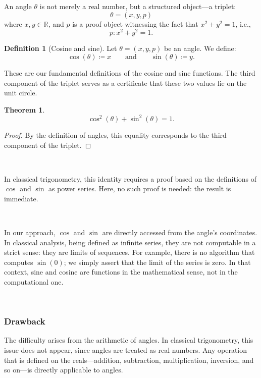 \documentclass[11pt]{article}
\newtheorem{theorem}{Theorem}
\theoremstyle{definition}
\newtheorem{definition}{Definition}[section]
\begin{document}
\

\

\noindent An angle \( \theta \) is not merely a real number, but a
structured object—a triplet:
\[
\theta = (x, y, p)
\]
where \( x, y \in \mathbb{R} \), and \( p \) is a proof object
witnessing the fact that \( x^2 + y^2 = 1 \), i.e.,
\[
p : x^2 + y^2 = 1.
\]

\begin{definition}[Cosine and sine]
Let \( \theta = (x, y, p) \) be an angle. We define:
\[
\cos(\theta) \coloneqq x \qquad \text{and} \qquad \sin(\theta) \coloneqq y.
\]
\end{definition}

\noindent These are our fundamental definitions of the cosine and sine
functions. The third component of the triplet serves as a certificate
that these two values lie on the unit circle.

\begin{theorem}
\[
\cos^2(\theta) + \sin^2(\theta) = 1.
\]
\end{theorem}

\begin{proof}
By the definition of angles, this equality corresponds to the third
component of the triplet.
\end{proof}

\

\noindent In classical trigonometry, this identity requires a proof
based on the definitions of \( \cos \) and \( \sin \) as power
series. Here, no such proof is needed: the result is immediate.

\

\noindent In our approach, \( \cos \) and \( \sin \) are directly
accessed from the angle's coordinates. In classical analysis, being
defined as infinite series, they are not computable in a strict sense:
they are limits of sequences. For example, there is no algorithm that
computes \( \sin(0) \); we simply assert that the limit of the series
is zero. In that context, sine and cosine are functions in the
mathematical sense, not in the computational one.

\

\subsubsection*{Drawback}

The difficulty arises from the arithmetic of angles. In classical
trigonometry, this issue does not appear, since angles are treated as
real numbers. Any operation that is defined on the reals—addition,
subtraction, multiplication, inversion, and so on—is directly
applicable to angles.
\end{document}
